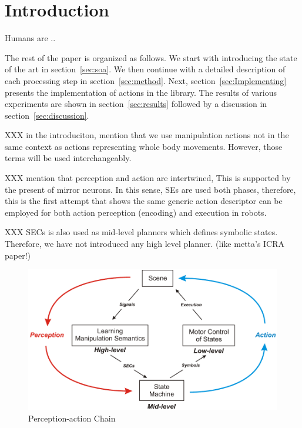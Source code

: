 \section{Introduction}


Humans are  ..
 
The rest of the paper is organized as follows. We start with introducing the state of the art in  section~\ref{sec:soa}. We then continue with a detailed description of each processing step in  section~\ref{sec:method}. 
Next, section~\ref{sec:Implementing} presents the implementation of actions in the library.
The results of various experiments are shown in section~\ref{sec:results} followed by a discussion in  section~\ref{sec:discussion}.


XXX in the introduciton, mention that we use manipulation actions not in the same context as actions representing whole body movements. However, those terms will be used interchangeably. 

XXX mention that perception and action are intertwined, This is supported by the present of mirror neurons. In this sense, SEs are used both phases, therefore, this is the first attempt that shows the same generic action descriptor can be employed for both action perception (encoding) and execution in robots. 

XXX SECs is also used as mid-level planners which defines symbolic states. Therefore, we have not introduced any high level planner. (like metta's ICRA paper!)


\begin{figure}[hb]
      \centering
      \includegraphics[scale=0.5]{./pdf/Figure_PerceptionAction.pdf}
      \caption{ Perception-action Chain}
      \label{fig:per_act_cycle}
\end{figure}

